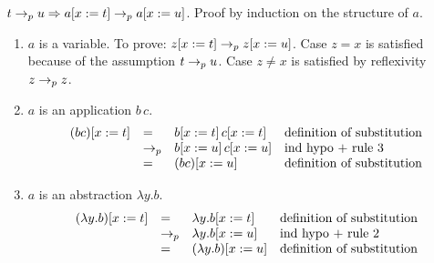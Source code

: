 \documentclass{article}
\begin{document}
\begin{lemma}
  $t \to_{p} u \Rightarrow a[x := t] \to_{p} a[x := u]$. Proof by induction on the
  structure of $a$.
  \begin{enumerate}
  \item $a$ is a variable. To prove: $z[x := t] \to_{p} z[x := u]$. Case $z=x$
    is satisfied because of the assumption $t \to_{p} u$. Case $z\ne x$ is
    satisfied by reflexivity $z \to_{p} z$.
  \item  $a$ is an application $b\, c$.
    $$
    \begin{array}{llll}
      (b c)[x:=t] &=& b[x:=t]\, c[x:=t] &\text{definition of substitution}\\
      &\to_{p} & b[x:=u]\, c[x:=u] &\text{ind hypo + rule 3} \\
      &=& (b c)[x:=u] & \text{definition of substitution}
    \end{array}
    $$
  \item  $a$ is an abstraction $\lambda y.b$.
    $$
    \begin{array}{llll}
      (\lambda y.b)[x:=t] &=& \lambda y. b[x:=t]  &\text{definition of substitution}\\
      &\to_{p} & \lambda y.b[x:=u] &\text{ind hypo + rule 2} \\
      &=& (\lambda y.b)[x:=u] & \text{definition of substitution}
    \end{array}
    $$
  \end{enumerate}
\end{lemma}
\end{document}
